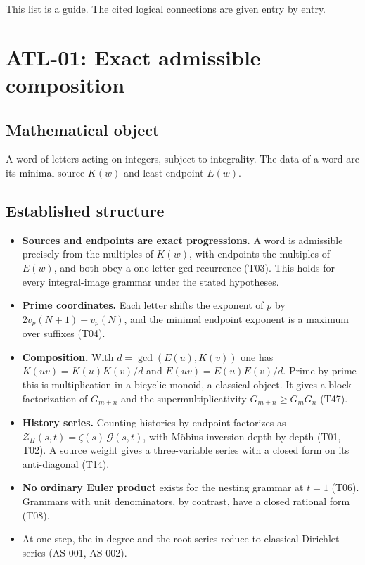 \documentclass[
  11pt,
]{article}
\providecommand{\tightlist}{%
  \setlength{\itemsep}{0pt}\setlength{\parskip}{0pt}}
\begin{document}
This list is a guide. The cited logical connections are given entry by
entry.

\hypertarget{atl-01-exact-admissible-composition}{%
\section{ATL-01: Exact admissible
composition}\label{atl-01-exact-admissible-composition}}

\hypertarget{mathematical-object}{%
\subsection{Mathematical object}\label{mathematical-object}}

A word of letters acting on integers, subject to integrality. The data
of a word are its minimal source \(K(w)\) and least endpoint \(E(w)\).

\hypertarget{established-structure}{%
\subsection{Established structure}\label{established-structure}}

\begin{itemize}
\tightlist
\item
  \textbf{Sources and endpoints are exact progressions.} A word is
  admissible precisely from the multiples of \(K(w)\), with endpoints
  the multiples of \(E(w)\), and both obey a one-letter gcd recurrence
  (T03). This holds for every integral-image grammar under the stated
  hypotheses.
\item
  \textbf{Prime coordinates.} Each letter shifts the exponent of \(p\)
  by \(2v_p(N+1)-v_p(N)\), and the minimal endpoint exponent is a
  maximum over suffixes (T04).
\item
  \textbf{Composition.} With \(d=\gcd(E(u),K(v))\) one has
  \(K(uv)=K(u)K(v)/d\) and \(E(uv)=E(u)E(v)/d\). Prime by prime this is
  multiplication in a bicyclic monoid, a classical object. It gives a
  block factorization of \(G_{m+n}\) and the supermultiplicativity
  \(G_{m+n}\ge G_mG_n\) (T47).
\item
  \textbf{History series.} Counting histories by endpoint factorizes as
  \(\mathcal Z_H(s,t)=\zeta(s)\,\mathcal G(s,t)\), with Möbius inversion
  depth by depth (T01, T02). A source weight gives a three-variable
  series with a closed form on its anti-diagonal (T14).
\item
  \textbf{No ordinary Euler product} exists for the nesting grammar at
  \(t=1\) (T06). Grammars with unit denominators, by contrast, have a
  closed rational form (T08).
\item
  At one step, the in-degree and the root series reduce to classical
  Dirichlet series (AS-001, AS-002).
\end{itemize}
\end{document}
